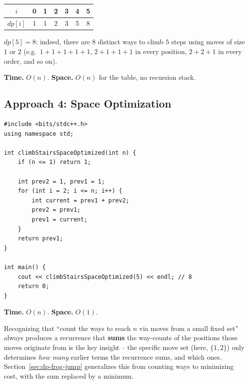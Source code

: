 
\begin{center}
\begin{tabular}{c|c|c|c|c|c|c}
$i$ & 0 & 1 & 2 & 3 & 4 & 5 \\ \hline
$\textit{dp}[i]$ & 1 & 1 & 2 & 3 & 5 & 8
\end{tabular}
\end{center}

$\textit{dp}[5]=8$: indeed, there are $8$ distinct ways to climb $5$
steps using moves of size $1$ or $2$ (e.g.\ $1{+}1{+}1{+}1{+}1$,
$2{+}1{+}1{+}1$ in every position, $2{+}2{+}1$ in every order, and so
on).

\begin{complexitybox}
\textbf{Time.} $O(n)$.
\textbf{Space.} $O(n)$ for the table, no recursion stack.
\end{complexitybox}

\subsection*{Approach 4: Space Optimization}

\begin{lstlisting}
#include <bits/stdc++.h>
using namespace std;

int climbStairsSpaceOptimized(int n) {
    if (n <= 1) return 1;

    int prev2 = 1, prev1 = 1;
    for (int i = 2; i <= n; i++) {
        int current = prev1 + prev2;
        prev2 = prev1;
        prev1 = current;
    }
    return prev1;
}

int main() {
    cout << climbStairsSpaceOptimized(5) << endl; // 8
    return 0;
}
\end{lstlisting}

\begin{complexitybox}
\textbf{Time.} $O(n)$.
\textbf{Space.} $O(1)$.
\end{complexitybox}

\begin{takeawaybox}
Recognizing that ``count the ways to reach $n$ via moves from a small
fixed set'' always produces a recurrence that \textbf{sums} the way-counts
of the positions those moves originate from is the key insight -- the
specific move set (here, $\{1,2\}$) only determines \emph{how many}
earlier terms the recurrence sums, and which ones. Section~\ref{sec:dp-frog-jump}
generalizes this from counting ways to minimizing cost, with the sum
replaced by a minimum.
\end{takeawaybox}
